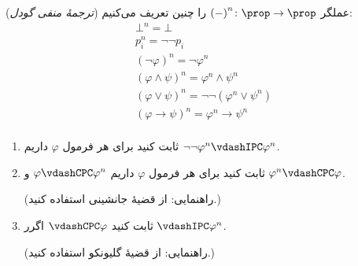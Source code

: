 (\emph{ترجمهٔ منفی گودل})
عملگر
$\mathord{(-)}^n\colon\prop\to\prop$
را چنین تعریف می‌کنیم:
\begin{gather*}
    \bot^n=\bot\\
    p_i^n=\neg\neg p_i\\
    (\neg\varphi)^n=\neg\varphi^n\\
    (\varphi\wedge\psi)^n=\varphi^n\wedge\psi^n\\
    (\varphi\vee\psi)^n=\neg\neg(\varphi^n\vee\psi^n)\\
    (\varphi\to\psi)^n=\varphi^n\to\psi^n\\
\end{gather*}\quad\vspace{-1.5cm}
\begin{enumerate}[label=(\alph*)]
    \item ثابت کنید برای هر فرمول
        $\varphi$
        داریم
        $\neg\neg\varphi^n\vdashIPC\varphi^n$.
    \item ثابت کنید برای هر فرمول
        $\varphi$
        داریم
        $\varphi\vdashCPC\varphi^n$
        و
        $\varphi^n\vdashCPC\varphi$.
        
        (راهنمایی: از قضیهٔ جانشینی استفاده کنید.)
    \item ثابت کنید
        $\vdashCPC\varphi$
        اگرر
        $\vdashIPC\varphi^n$.%
        
        (راهنمایی: از قضیهٔ گلیونکو استفاده کنید.)
\end{enumerate}\quad\vspace{-0.5cm}
